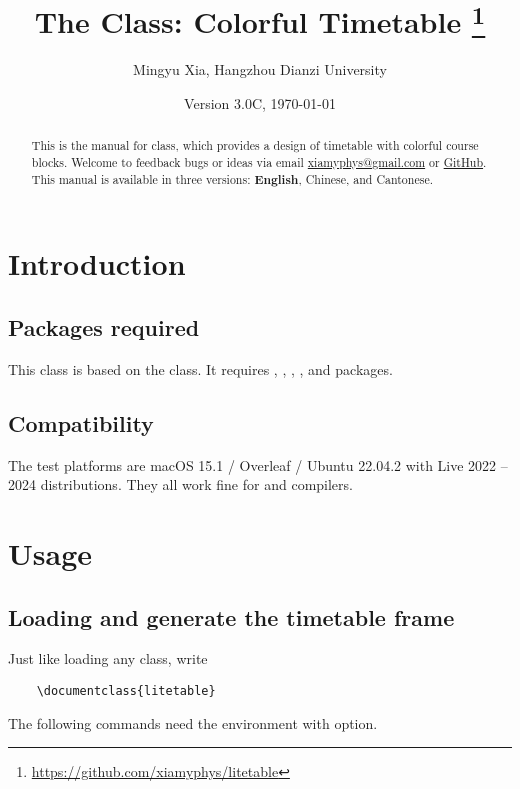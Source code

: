 \documentclass[letterpaper]{l3doc}
\title{
    The \cls{litetable} Class: Colorful Timetable
    \thanks{\url{https://github.com/xiamyphys/litetable}}
}
\author{Mingyu Xia, Hangzhou Dianzi University}
\affil{\href{mailto:xiamyphys@gmail.com}{xiamyphys@gmail.com}}
\date{Version 3.0C, \today}
\begin{document}
\maketitle

\begin{abstract}
    This is the manual for  class, which provides a design of timetable with colorful course blocks. Welcome to feedback bugs or ideas via email \href{mailto:xiamyphys@gmail.com}{xiamyphys@gmail.com} or \href{https://github.com/xiamyphys/litetable/issues}{GitHub}. This manual is available in three versions: \textbf{English}, Chinese, and Cantonese.
\end{abstract}

\section{Introduction}

\subsection{Packages required}

This class is based on the  class. It requires , , , , and  packages. 

\subsection{Compatibility}

The test platforms are macOS 15.1 / Overleaf / Ubuntu 22.04.2 with Live 2022 -- 2024 distributions. They all work fine for  and  compilers.

\section{Usage}

\subsection{Loading  and generate the timetable frame}

Just like loading any class, write

\begin{Verbatim}
    \documentclass{litetable}
\end{Verbatim}

The following commands need the  environment with  option.
\end{document}
